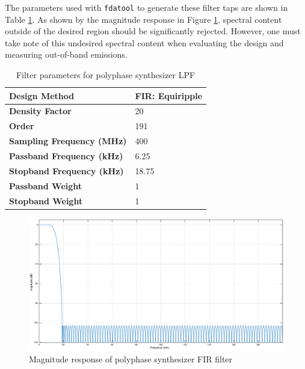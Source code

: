 The parameters used with \texttt{fdatool} to generate these
filter taps are shown in Table \ref{tab:tx_polysynth}. As shown by the magnitude
response in Figure \ref{fig:filtresp_tx_ps}, spectral content outside of the
desired region should be significantly rejected. However, one must take note
of this undesired spectral content when evaluating the design and measuring
out-of-band emissions.

\begin{table}[h]
  \centering
  \caption{Filter parameters for polyphase synthesizer LPF}
  \label{tab:tx_polysynth}
  \footnotesize
  \begin{tabular} {|l|l|}
    \hline
    \textbf{Design Method}              & FIR: Equiripple \\ \hline
    \textbf{Density Factor}             & 20              \\ \hline
    \textbf{Order}                      & 191             \\ \hline
    \textbf{Sampling Frequency (MHz)}   & 400             \\ \hline
    \textbf{Passband Frequency (kHz)}   & 6.25            \\ \hline
    \textbf{Stopband Frequency (kHz)}   & 18.75           \\ \hline
    \textbf{Passband Weight}            & 1               \\ \hline
    \textbf{Stopband Weight}            & 1               \\ \hline
  \end{tabular}
\end{table}

\begin{figure}[h]
  \centering
  \includegraphics[width=6in]{images/frs/filter/tx/polyphase-synth-fir.eps}
  \caption{Magnitude response of polyphase synthesizer FIR filter}
  \label{fig:filtresp_tx_ps}
\end{figure}

